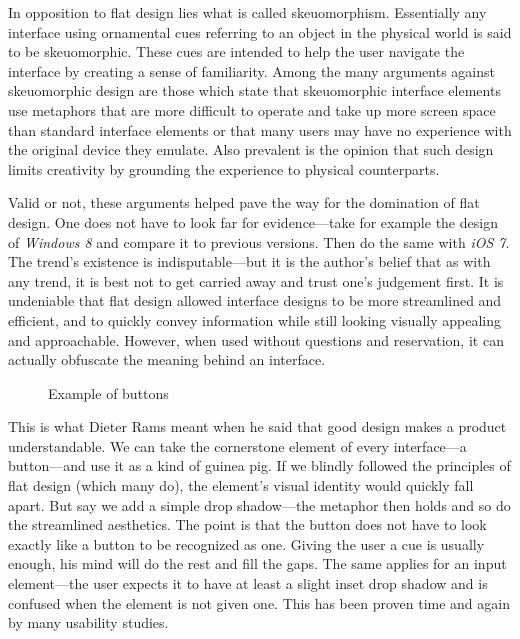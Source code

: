 \documentclass[thesis=M,english,hidelinks]{FITthesis}[2012/10/20]
\begin{document}
In opposition to flat design lies what is called skeuomorphism. Essentially any interface using ornamental cues referring to an object in the physical world is said to be skeuomorphic. These cues are intended to help the user navigate the interface by creating a sense of familiarity. Among the many arguments against skeuomorphic design are those which state that skeuomorphic interface elements use metaphors that are more difficult to operate and take up more screen space than standard interface elements or that many users may have no experience with the original device they emulate. Also prevalent is the opinion that such design limits creativity by grounding the experience to physical counterparts.

Valid or not, these arguments helped pave the way for the domination of flat design. One does not have to look far for evidence---take for example the design of \textit{Windows 8} and compare it to previous versions. Then do the same with \textit{iOS 7}. The trend's existence is indisputable---but it is the author's belief that as with any trend, it is best not to get carried away and trust one's judgement first. It is undeniable that flat design allowed interface designs to be more streamlined and efficient, and to quickly convey information while still looking visually appealing and approachable. However, when used without questions and reservation, it can actually obfuscate the meaning behind an interface.

\begin{figure}
  \setlength\fboxsep{0pt}
  \setlength\fboxrule{0.2pt}
  \caption{Example of buttons}
  \label{fig:buttons_example}
\end{figure}

This is what Dieter Rams meant when he said that good design makes a product understandable. We can take the cornerstone element of every interface---a button---and use it as a kind of guinea pig. If we blindly followed the principles of flat design (which many do), the element's visual identity would quickly fall apart. But say we add a simple drop shadow---the metaphor then holds and so do the streamlined aesthetics. The point is that the button does not have to look exactly like a button to be recognized as one. Giving the user a cue is usually enough, his mind will do the rest and fill the gaps. The same applies for an input element---the user expects it to have at least a slight inset drop shadow and is confused when the element is not given one. This has been proven time and again by many usability studies.
\end{document}
